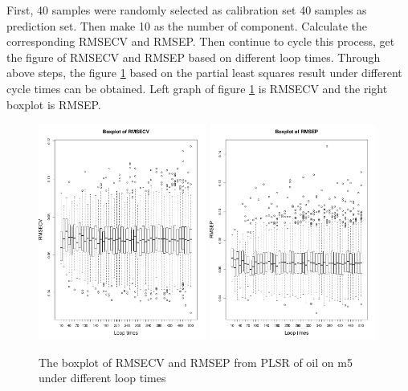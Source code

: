 \documentclass[a4paper,12pt,titlepage]{article} %
\numberwithin{equation}{section}  %
\begin{document}
	First, 40 samples were randomly selected as calibration set 40 samples as prediction set. Then make 10 as the number of component. Calculate the corresponding RMSECV and RMSEP. Then continue to cycle this process, get the figure of RMSECV and RMSEP based on different loop times. Through above steps, the  figure \ref{fig:sd_RMSECV_RMSEP} based on the partial least squares result under different cycle times can be obtained. Left graph of figure \ref{fig:sd_RMSECV_RMSEP} is RMSECV and the right boxplot is RMSEP.
	
	\begin{figure}[]    %
		\centering           %
		\includegraphics[width=5.5cm, angle=0]{boxplot_RMSECV_loop_times_500.pdf}  %
		\includegraphics[width=5.5cm, angle=0]{boxplot_RMSEP_loop_times_500.pdf} %
		\caption{The boxplot of RMSECV and RMSEP from PLSR of oil on m5 under different loop times}          %
		\label{fig:sd_RMSECV_RMSEP}               %
	\end{figure}                        %
	
\end{document}
